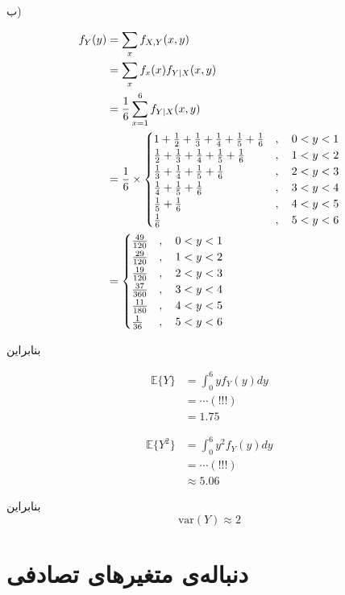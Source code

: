 \documentclass[10pt,letterpaper]{report}
\newcommand{\eqn}[1]{
\[\begin{split}
#1
\end{split}\]
}
\begin{document}
ب)
\eqn{
f_Y(y)&=\sum_x f_{X,Y}(x,y)
\\&=\sum_x f_x(x)f_{Y|X}(x,y)
\\&={1\over 6}\sum_{x=1}^6f_{Y|X}(x,y)
\\&={1\over 6}\times\begin{cases}
1+{1\over 2}+{1\over 3}+{1\over 4}+{1\over 5}+{1\over 6}&,\quad 0<y<1\\
{1\over 2}+{1\over 3}+{1\over 4}+{1\over 5}+{1\over 6}&,\quad 1<y<2\\
{1\over 3}+{1\over 4}+{1\over 5}+{1\over 6}&,\quad 2<y<3\\
{1\over 4}+{1\over 5}+{1\over 6}&,\quad 3<y<4\\
{1\over 5}+{1\over 6}&,\quad 4<y<5\\
{1\over 6}&,\quad 5<y<6\\
\end{cases}
\\&=\begin{cases}
{49\over 120}&,\quad 0<y<1\\
{29\over 120}&,\quad 1<y<2\\
{19\over 120}&,\quad 2<y<3\\
{37\over 360}&,\quad 3<y<4\\
{11\over 180}&,\quad 4<y<5\\
{1\over 36}&,\quad 5<y<6\\
\end{cases}
}

بنابراین
\eqn{
\mathbb{E}\{Y\}&=\int_0^6 yf_Y(y)dy
\\&=\cdots(!!!)
\\&=1.75
}

\eqn{
\mathbb{E}\{Y^2\}&=\int_0^6 y^2f_Y(y)dy
\\&=\cdots(!!!)
\\&\approx5.06
}
بنابراین
$$
\text{var}(Y)\approx2
$$

\chapter{دنباله‌ی متغیرهای تصادفی}










\end{document}
